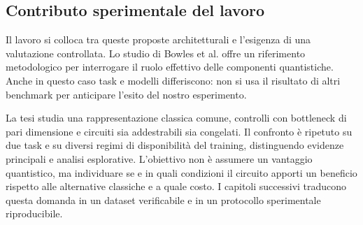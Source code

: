 \subsection{Contributo sperimentale del lavoro}

Il lavoro si colloca tra queste proposte architetturali e l'esigenza di
una valutazione controllata. Lo studio di Bowles et al.
\cite{bowles2024benchmarking} offre un riferimento metodologico per
interrogare il ruolo effettivo delle componenti quantistiche. Anche
in questo caso task e modelli differiscono: non si usa il risultato
di altri benchmark per anticipare l'esito del nostro esperimento.

La tesi studia una rappresentazione classica comune, controlli con
bottleneck di pari dimensione e circuiti sia addestrabili sia congelati.
Il confronto è ripetuto su due task e su diversi regimi di disponibilità
del training, distinguendo evidenze principali e analisi esplorative.
L'obiettivo non è assumere un vantaggio quantistico, ma individuare
se e in quali condizioni il circuito apporti un beneficio rispetto
alle alternative classiche e a quale costo. I capitoli successivi
traducono questa domanda in un dataset verificabile e in un protocollo
sperimentale riproducibile.

